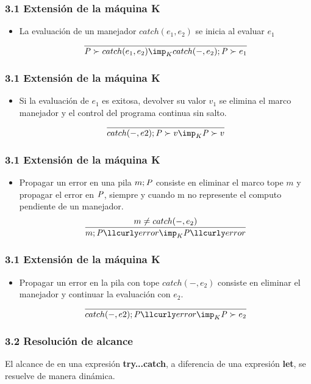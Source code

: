 \documentclass[xcolor=dvipsnames,table,spanish]{beamer}
\begin{document}
\begin{frame}
\frametitle{3.1 Extensión de la máquina K}
\begin{itemize}
		\item La evaluación de un manejador $catch(e_1,e_2)$ se inicia al evaluar $e_1$
        \[ \frac{}{\textrm{\textit{P}} \succ catch(e_1,e_2) \imp _K catch(-,e_2);\textrm{\textit{P}} \succ e_1} \]
\end{itemize}
\end{frame}

\begin{frame}
\frametitle{3.1 Extensión de la máquina K}
\begin{itemize}
		\item Si la evaluación de $e_1$ es exitosa, devolver su valor $v_1$ se elimina el marco manejador y el control del programa continua sin salto.
        \[ \frac{}{catch(-,e2) ; \textrm{\textit{P}} \succ v \imp _K \textrm{\textit{P}} \succ v} \]
\end{itemize}
\end{frame}

\begin{frame}
\frametitle{3.1 Extensión de la máquina K}
\begin{itemize}
		\item Propagar un error en una pila $m;\textrm{\textit{P}}$  consiste en eliminar el marco tope $m$ y propagar el error
en $\textrm{\textit{P}}$, siempre y cuando m no represente el computo pendiente de un manejador.
        \[ \frac{m \neq catch(-,e_2)}{m;\textrm{\textit{P}} \llcurly error \imp _K \textrm{\textit{P}} \llcurly error} \]
\end{itemize}
\end{frame}

\begin{frame}
\frametitle{3.1 Extensión de la máquina K}
\begin{itemize}
		\item Propagar un error en la pila con tope $catch(-,e_2)$ consiste en eliminar el manejador y continuar la evaluación con $e_2$.
        \[ \frac{}{catch(-,e2);\textrm{\textit{P}} \llcurly error \imp _K \textrm{\textit{P}} \succ e_2} \]
\end{itemize}
\end{frame}

\begin{frame}
\frametitle{3.2 Resolución de alcance}
El alcance de en una expresión \textbf{try...catch}, a diferencia de una expresión \textbf{let}, se resuelve de manera dinámica.

\end{frame}
\end{document}
